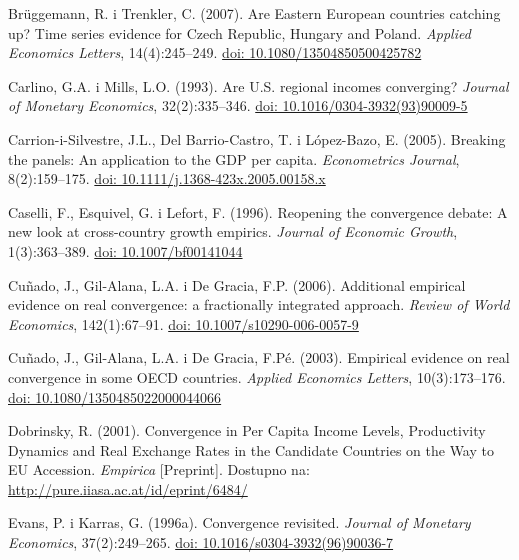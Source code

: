 \documentclass{crebsshr}
\begin{document}
\begin{thebibliography}{99}
Brüggemann, R. i Trenkler, C. (2007). Are Eastern European countries catching up?
Time series evidence for Czech Republic, Hungary and Poland.
\emph{Applied Economics Letters}, 14(4):245--249.
\href{https://doi.org/10.1080/13504850500425782}{doi: 10.1080/13504850500425782}

Carlino, G.A. i Mills, L.O. (1993). Are U.S. regional incomes converging?
\emph{Journal of Monetary Economics}, 32(2):335--346.
\href{https://doi.org/10.1016/0304-3932(93)90009-5}{doi: 10.1016/0304-3932(93)90009-5}

Carrion-i-Silvestre, J.L., Del Barrio-Castro, T. i López-Bazo, E. (2005).
Breaking the panels: An application to the GDP per capita.
\emph{Econometrics Journal}, 8(2):159--175.
\href{https://doi.org/10.1111/j.1368-423x.2005.00158.x}{doi: 10.1111/j.1368-423x.2005.00158.x}

Caselli, F., Esquivel, G. i Lefort, F. (1996). Reopening the convergence debate:
A new look at cross-country growth empirics.
\emph{Journal of Economic Growth}, 1(3):363--389.
\href{https://doi.org/10.1007/bf00141044}{doi: 10.1007/bf00141044}

Cuñado, J., Gil-Alana, L.A. i De Gracia, F.P. (2006). Additional empirical evidence on real
convergence: a fractionally integrated approach.
\emph{Review of World Economics}, 142(1):67--91.
\href{https://doi.org/10.1007/s10290-006-0057-9}{doi: 10.1007/s10290-006-0057-9}

Cuñado, J., Gil-Alana, L.A. i De Gracia, F.Pé. (2003). Empirical evidence on real convergence
in some OECD countries.
\emph{Applied Economics Letters}, 10(3):173--176.
\href{https://doi.org/10.1080/1350485022000044066}{doi: 10.1080/1350485022000044066}

Dobrinsky, R. (2001). Convergence in Per Capita Income Levels, Productivity Dynamics and
Real Exchange Rates in the Candidate Countries on the Way to EU Accession.
\emph{Empirica} [Preprint]. 
Dostupno na: \url{http://pure.iiasa.ac.at/id/eprint/6484/}

Evans, P. i Karras, G. (1996a). Convergence revisited.
\emph{Journal of Monetary Economics}, 37(2):249--265.
\href{https://doi.org/10.1016/s0304-3932(96)90036-7}{doi: 10.1016/s0304-3932(96)90036-7}


\end{thebibliography}
\end{document}
